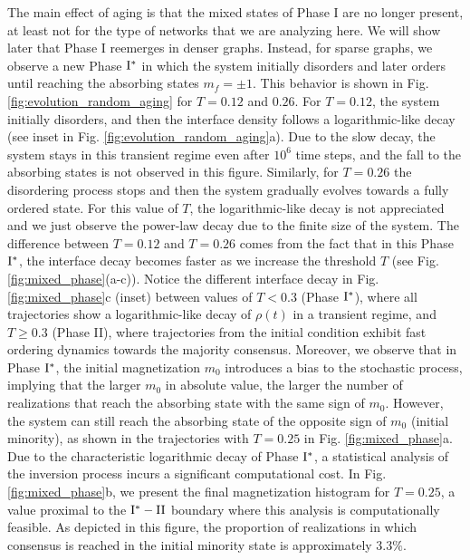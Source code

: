 	The main effect of aging is that the mixed states of Phase I are no longer present, at least not for the type of networks that we are analyzing here. We will show later that Phase I reemerges in denser graphs. Instead, for sparse graphs, we observe a new Phase ${\rm I}^{*}$ in which the system initially disorders and later orders until reaching the absorbing states $m_f = \pm 1$. This behavior is shown in Fig. \ref{fig:evolution_random_aging} for $T = 0.12$ and $0.26$. For $T = 0.12$, the system initially disorders, and then the interface density follows a logarithmic-like decay (see inset in Fig. \ref{fig:evolution_random_aging}a). Due to the slow decay, the system stays in this transient regime even after $10^{6}$ time steps, and the fall to the absorbing states is not observed in this figure. Similarly, for $T = 0.26$ the disordering process stops and then the system gradually evolves towards a fully ordered state. For this value of $T$, the logarithmic-like decay is not appreciated and we just observe the power-law decay due to the finite size of the system. The difference between $T = 0.12$ and $T = 0.26$ comes from the fact that in this Phase ${\rm I}^{*}$, the interface decay becomes faster as we increase the threshold $T$ (see Fig. \ref{fig:mixed_phase}(a-c)). Notice the different interface decay in Fig. \ref{fig:mixed_phase}c (inset) between values of $T < 0.3$ (Phase ${\rm I}^{*}$), where all trajectories show a logarithmic-like decay of $\rho(t)$ in a transient regime, and $T \geq 0.3$ (Phase II), where trajectories from the initial condition exhibit fast ordering dynamics towards the majority consensus. Moreover, we observe that in Phase ${\rm I}^{*}$, the initial magnetization $m_0$ introduces a bias to the stochastic process, implying that the larger $m_0$ in absolute value, the larger the number of realizations that reach the absorbing state with the same sign of $m_0$. However, the system can still reach the absorbing state of the opposite sign of $m_0$ (initial minority), as shown in the trajectories with $T = 0.25$ in Fig. \ref{fig:mixed_phase}a. Due to the characteristic logarithmic decay of Phase ${\rm I}^{*}$, a statistical analysis of the inversion process incurs a significant computational cost. In Fig. \ref{fig:mixed_phase}b, we present the final magnetization histogram for $T=0.25$, a value proximal to the ${\rm I}^{*} - {\rm II}$ boundary where this analysis is computationally feasible. As depicted in this figure, the proportion of realizations in which consensus is reached in the initial minority state is approximately $3.3\%$.
	
